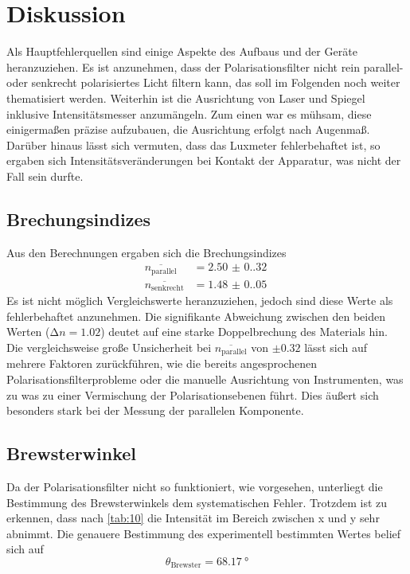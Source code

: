 \section{Diskussion}
\label{sec:Diskussion}

Als Hauptfehlerquellen sind einige Aspekte des Aufbaus und der Geräte heranzuziehen.
Es ist anzunehmen, dass der Polarisationsfilter nicht rein parallel- oder 
senkrecht polarisiertes Licht filtern kann, das soll im Folgenden noch weiter 
thematisiert werden. Weiterhin ist die Ausrichtung von Laser und Spiegel inklusive 
Intensitätsmesser anzumängeln. Zum einen war es mühsam, diese einigermaßen präzise 
aufzubauen, die Ausrichtung erfolgt nach Augenmaß. Darüber hinaus lässt sich 
vermuten, dass das Luxmeter fehlerbehaftet ist, so ergaben sich 
Intensitätsveränderungen bei Kontakt der Apparatur, was nicht der Fall sein 
durfte.

\subsection{Brechungsindizes}
Aus den Berechnungen ergaben sich die Brechungsindizes
\begin{align*}
    \overline{n_\text{parallel}}  &= \qty{2.50(0.32)}{} \\
    \overline{n_\text{senkrecht}} &= \qty{1.48(0.05)}{}
\end{align*}
\noindent Es ist nicht möglich Vergleichswerte heranzuziehen, jedoch sind diese 
Werte als fehlerbehaftet anzunehmen. Die signifikante Abweichung zwischen den
beiden Werten ($\increment n = 1.02$) deutet auf eine starke Doppelbrechung des
Materials hin. Die vergleichsweise große Unsicherheit bei $\overline{n_\text{parallel}}$
von $\pm 0.32$ lässt sich auf mehrere Faktoren zurückführen, wie die bereits 
angesprochenen Polarisationsfilterprobleme oder die manuelle Ausrichtung von 
Instrumenten, was zu was zu einer Vermischung der Polarisationsebenen führt.
Dies äußert sich besonders stark bei der Messung der parallelen Komponente.

\subsection{Brewsterwinkel}
Da der Polarisationsfilter nicht so funktioniert, wie vorgesehen, unterliegt die
Bestimmung des Brewsterwinkels dem systematischen Fehler. Trotzdem ist zu erkennen, 
dass nach \autoref{tab:10} die Intensität im Bereich zwischen x und y 
sehr abnimmt. Die genauere Bestimmung des experimentell bestimmten Wertes 
belief sich auf
\begin{equation*}
    \theta_\text{Brewster} = \qty{68.17}{\degree}
\end{equation*}   

